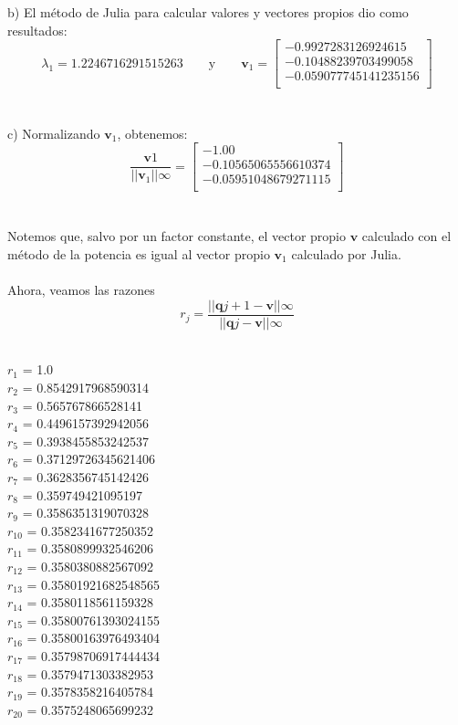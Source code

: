\documentclass[11pt]{article}
\begin{document}
b) El método de Julia para calcular valores y vectores propios dio como resultados:
\[
 \lambda_1 = 1.2246716291515263
 \qquad\text{y}\qquad
 \textbf{v}_1 = \begin{bmatrix}
-0.9927283126924615 \\
-0.10488239703499058 \\
-0.059077745141235156 \\
\end{bmatrix}
 \]
 \\
 \\

 c) Normalizando $\textbf{v}_1$, obtenemos:
 $$\frac{\textbf{v}1}{||\textbf{v}_1||\infty} =
\begin{bmatrix}
-1.00 \\
-0.10565065556610374 \\
-0.05951048679271115 \\
\end{bmatrix}$$
\\
\\

Notemos que, salvo por un factor constante, el vector propio $\textbf{v}$ calculado con el método de la potencia es igual al vector propio $\textbf{v}_1$ calculado por Julia.
\\
\\

Ahora, veamos las razones
$$
r_j = \frac{||\textbf{q}{j+1} - \textbf{v}||\infty}{||\textbf{q}{j} - \textbf{v}||\infty}
$$
\\

\begin{multicols}{3}
\noindent
$ r_{1} $ = 1.0 \\
$ r_{2} $ = 0.8542917968590314 \\
$ r_{3} $ = 0.565767866528141 \\
$ r_{4} $ = 0.4496157392942056 \\
$ r_{5} $ = 0.3938455853242537 \\
$ r_{6} $ = 0.37129726345621406 \\
$ r_{7} $ = 0.3628356745142426 \\
$ r_{8} $ = 0.359749421095197 \\
$ r_{9} $ = 0.3586351319070328 \\
$ r_{10} $ = 0.3582341677250352 \\
$ r_{11} $ = 0.3580899932546206 \\
$ r_{12} $ = 0.3580380882567092 \\
$ r_{13} $ = 0.35801921682548565 \\
$ r_{14} $ = 0.3580118561159328 \\
$ r_{15} $ = 0.35800761393024155 \\
$ r_{16} $ = 0.35800163976493404 \\
$ r_{17} $ = 0.35798706917444434 \\
$ r_{18} $ = 0.3579471303382953 \\
$ r_{19} $ = 0.3578358216405784 \\
$ r_{20} $ = 0.3575248065699232 \\
\end{multicols}
\end{document}
